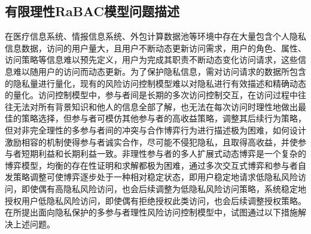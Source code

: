 \subsection{有限理性RaBAC模型问题描述}
\label{subsec:issues}
在医疗信息系统、情报信息系统、外包计算数据池等环境中存在大量包含个人隐私信息数据，访问的用户量大，且用户不断动态更新访问需求，用户的角色、属性、访问策略等信息难以预先定义，用户为完成其职责不断动态变化访问请求，这些信息难以随用户的访问而动态更新。为了保护隐私信息，需对访问请求的数据所包含的隐私量进行量化，现有的风险访问控制模型难以对隐私进行有效描述和精确动态的量化。访问控制模型中，参与者间是长期的多次访问控制交互，在访问过程中往往无法对所有背景知识和他人的信息全部了解，也无法在每次访问时理性地做出最佳的策略选择，但参与者可模仿其他参与者的高收益策略，调整其后续行为策略，但对非完全理性的多参与者间的冲突与合作博弈行为进行描述极为困难，如何设计激励相容的机制使得参与者诚实合作，尽可能不侵犯隐私，且取得高收益，并使参与者短期利益和长期利益一致。非理性参与者的多人扩展式动态博弈是一个复杂的博弈模型，均衡的存在性证明和求解都极为困难，通过多次交互式博弈和参与者自发策略调整可使博弈逐步处于一种相对稳定状态，即用户稳定地请求低隐私风险访问，即使偶有高隐私风险访问，也会后续调整为低隐私风险访问策略，系统稳定地授权用户低隐私风险访问，即使偶有拒绝授权此类访问，也会后续调整授权策略。
在所提出面向隐私保护的多参与者理性风险访问控制模型中，试图通过以下措施解决上述问题。
